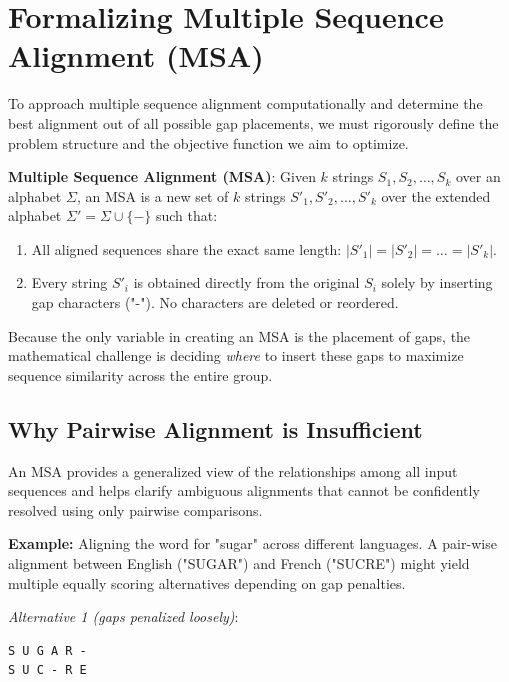 \section{Formalizing Multiple Sequence Alignment (MSA)}

To approach multiple sequence alignment computationally and determine the best alignment out of all possible gap placements, we must rigorously define the problem structure and the objective function we aim to optimize.

\begin{important}
    \textbf{Multiple Sequence Alignment (MSA)}: Given $k$ strings $S_1, S_2, \dots, S_k$ over an alphabet $\Sigma$, an MSA is a new set of $k$ strings $S'_1, S'_2, \dots, S'_k$ over the extended alphabet $\Sigma' = \Sigma \cup \{-\}$ such that:
    \begin{enumerate}
        \item All aligned sequences share the exact same length: $|S'_1| = |S'_2| = \dots = |S'_k|$.
        \item Every string $S'_i$ is obtained directly from the original $S_i$ solely by inserting gap characters ("-"). No characters are deleted or reordered.
    \end{enumerate}
\end{important}

Because the only variable in creating an MSA is the placement of gaps, the mathematical challenge is deciding \textit{where} to insert these gaps to maximize sequence similarity across the entire group.

\subsection{Why Pairwise Alignment is Insufficient}

An MSA provides a generalized view of the relationships among all input sequences and helps clarify ambiguous alignments that cannot be confidently resolved using only pairwise comparisons.

\textbf{Example:} Aligning the word for "sugar" across different languages.
A pair-wise alignment between English ("SUGAR") and French ("SUCRE") might yield multiple equally scoring alternatives depending on gap penalties.

\textit{Alternative 1 (gaps penalized loosely)}:
\begin{verbatim}
S U G A R -
S U C - R E
\end{verbatim}

